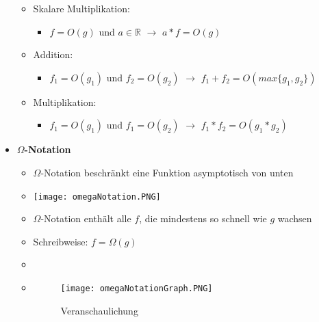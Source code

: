 \begin{itemize}
\begin{itemize}
                \item Skalare Multiplikation:
                    \begin{itemize}
                        \item $f= O(g)$ und $a \in \mathbb{R}$ $\rightarrow$ $a*f = O(g)$
                    \end{itemize}
                
                \item Addition: 
                    \begin{itemize}
                        \item $f_1 = O(g_1)$ und $f_2 = O(g_2)$ $\rightarrow$ $f_1+f_2= O(max\{g_1,g_2\})$
                    \end{itemize}
                
                \item Multiplikation:
                    \begin{itemize}
                        \item $f_1 = O(g_1)$ und $f_1 = O(g_2)$ $\rightarrow$ $f_1*f_2= O(g_1*g_2)$
                    \end{itemize}
            \end{itemize}
        
        \item \textbf{$\Omega$-Notation}
            \begin{itemize}
                \item $\Omega$-Notation beschränkt eine Funktion asymptotisch von unten
                \item[] \texttt{[image: omegaNotation.PNG]}
                \item $\Omega$-Notation enthält alle $f$, die mindestens so schnell wie $g$ wachsen
                \item Schreibweise: $f = \Omega(g)$
                \item[]
                \item[] 
                    \begin{minipage}{0.3\textwidth}
                    \begin{figure}[H]
                        \centering
                        \texttt{[image: omegaNotationGraph.PNG]}
                        \caption{Veranschaulichung}
                        \label{}
                    \end{figure}
                    \end{minipage}
                    \begin{minipage}[t]{0.6\textwidth}
                    \vspace{-3cm}
                    \end{minipage}
            \end{itemize}
        

\end{itemize}
